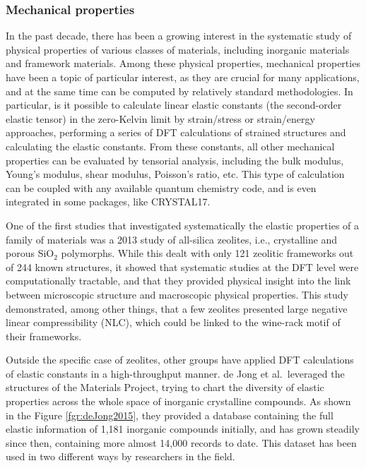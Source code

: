 \documentclass[main.tex]{subfiles}
\begin{document}
\subsubsection{Mechanical properties}

In the past decade, there has been a growing interest in the systematic study of physical properties of various classes of materials, including inorganic materials and framework materials. Among these physical properties, mechanical properties have been a topic of particular interest, as they are crucial for many applications, and at the same time can be computed by relatively standard methodologies. In particular, is it possible to calculate linear elastic constants (the second-order elastic tensor) in the zero-Kelvin limit by strain/stress or strain/energy approaches, performing a series of DFT calculations of strained structures and calculating the elastic constants. From these constants, all other mechanical properties can be evaluated by tensorial analysis,\cite{Marmier_2010} including the bulk modulus, Young's modulus, shear modulus, Poisson's ratio, etc. This type of calculation can be coupled with any available quantum chemistry code,\cite{Golesorkhtabar_2013} and is even integrated in some packages, like CRYSTAL17.\cite{Dovesi_2018}

One of the first studies that investigated systematically the elastic properties of a family of materials was a 2013 study of all-silica zeolites,\cite{Coudert_2013} i.e., crystalline and porous SiO$_2$ polymorphs. While this dealt with only 121 zeolitic frameworks out of 244 known structures, it showed that systematic studies at the DFT level were computationally tractable, and that they provided physical insight into the link between microscopic structure and macroscopic physical properties. This study demonstrated, among other things, that a few zeolites presented large negative linear compressibility (NLC), which could be linked to the wine-rack motif of their frameworks.

Outside the specific case of zeolites, other groups have applied DFT calculations of elastic constants in a high-throughput manner. de Jong et al.\ leveraged the structures of the Materials Project\cite{Matgenome, Jain_2013}, trying to chart the diversity of elastic properties across the whole space of inorganic crystalline compounds.\cite{deJong_2015} As shown in the Figure \ref{fgr:deJong2015}, they provided a database containing the full elastic information of 1,181 inorganic compounds initially, and has grown steadily since then, containing more almost 14,000 records to date.\cite{MaterialsProject} This dataset has been used in two different ways by researchers in the field.
\end{document}
